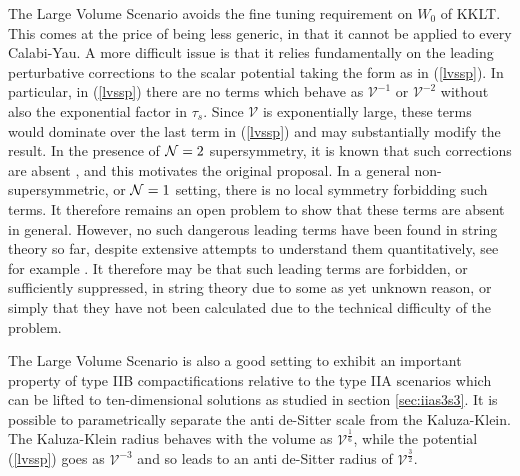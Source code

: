 \documentclass[11pt,a4paper]{article}
\numberwithin{equation}{section}
\numberwithin{table}{section}\setlength{\multlinegap}{25pt}
\newcommand{\cV}{\mathcal{V}}
\begin{document}
The Large Volume Scenario avoids the fine tuning requirement on $W_0$ of KKLT. This comes at the price of being less generic, in that it cannot be applied to every Calabi-Yau. A more difficult issue is that it relies fundamentally on the leading perturbative corrections to the scalar potential taking the form as in (\ref{lvssp}). In particular, in (\ref{lvssp}) there are no terms which behave as $\cV^{-1}$ or $\cV^{-2}$ without also the exponential factor in $\tau_s$. Since $\cV$ is exponentially large, these terms would dominate over the last term in (\ref{lvssp}) and may substantially modify the result. In the presence of ${\cal N}=2$ supersymmetry, it is known that such corrections are absent \cite{Becker:2002nn}, and this motivates the original proposal. In a general non-supersymmetric, or ${\cal N}=1$ setting, there is no local symmetry forbidding such terms. It therefore remains an open problem to show that these terms are absent in general. However, no such dangerous leading terms have been found in string theory so far, despite extensive attempts to understand them quantitatively, see for example \cite{Berg:2005ja,Berg:2007wt,Cicoli:2007xp,Cicoli:2008va,Conlon:2010ji,GarciaEtxebarria:2012zm,Pedro:2013qga,Grimm:2013gma,Berg:2014ama,Minasian:2015bxa,Grimm:2013bha,Grimm:2014xva,Grimm:2014efa,Grimm:2015mua,Grimm:2017okk,Grimm:2017pid,Haack:2018ufg}. It therefore may be that such leading terms are forbidden, or sufficiently suppressed, in string theory due to some as yet unknown reason, or simply that they have not been calculated due to the technical difficulty of the problem.

The Large Volume Scenario is also a good setting to exhibit an important property of type IIB compactifications relative to the type IIA scenarios which can be lifted to ten-dimensional solutions as studied in section \ref{sec:iias3s3}. It is possible to parametrically separate the anti de-Sitter scale from the Kaluza-Klein. The Kaluza-Klein radius behaves with the volume as $\cV^{\frac16}$, while the potential (\ref{lvssp}) goes as $\cV^{-3}$ and so leads to an anti de-Sitter radius of $\cV^{\frac32}$. 
\end{document}
